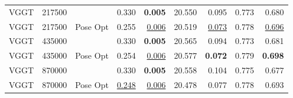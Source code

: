 \begin{table}[H]
\begin{tabular}{lrlrrrrrr}
VGGT & 217500 &  & 0.330 & \textbf{0.005} & 20.550 & 0.095 & 0.773 & 0.680 \\
VGGT & 217500 & Pose Opt & 0.255 & \underline{0.006} & 20.519 & \underline{0.073} & 0.778 & \underline{0.696} \\
VGGT & 435000 &  & 0.330 & \textbf{0.005} & 20.565 & 0.094 & 0.773 & 0.681 \\
VGGT & 435000 & Pose Opt & 0.254 & \underline{0.006} & 20.577 & \textbf{0.072} & 0.779 & \textbf{0.698} \\
VGGT & 870000 &  & 0.330 & \textbf{0.005} & 20.558 & 0.104 & 0.775 & 0.677 \\
VGGT & 870000 & Pose Opt & \underline{0.248} & \underline{0.006} & 20.478 & 0.077 & 0.778 & 0.693 \\
\bottomrule
\end{tabular}
\end{table}
